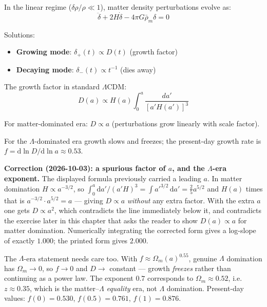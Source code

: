 \begin{theorem}\label{thm:linear-growth}
In the linear regime ($\delta \rho / \rho \ll 1$), matter density perturbations evolve as\cite{peebles1980,dodelson2003}:
\begin{equation}
\ddot{\delta} + 2H \dot{\delta} - 4\pi G \bar{\rho}_m \delta = 0
\end{equation}

Solutions:
\begin{itemize}
\item \textbf{Growing mode}: $\delta_+(t) \propto D(t)$ (growth factor)
\item \textbf{Decaying mode}: $\delta_-(t) \propto t^{-1}$ (dies away)
\end{itemize}

The growth factor in standard $\Lambda$CDM:
\begin{equation}
D(a) \propto H(a) \int_0^a \frac{da'}{[a' H(a')]^3}
\end{equation}

For matter-dominated era: $D \propto a$ (perturbations grow linearly with scale factor).

For the $\Lambda$-dominated era growth slows and freezes; the present-day growth
rate is $f = \mathrm{d}\ln D/\mathrm{d}\ln a \approx 0.53$.

\medskip
\noindent\textbf{Correction (2026-10-03): a spurious factor of $a$, and the
$\Lambda$-era exponent.}
The displayed formula previously carried a leading $a$. In matter domination
$H \propto a^{-3/2}$, so
$\int_0^a \mathrm{d}a'/(a'H)^3 = \int a'^{3/2}\,\mathrm{d}a' = \tfrac25 a^{5/2}$
and $H(a)$ times that is $a^{-3/2}\cdot a^{5/2} = a$ --- giving $D \propto a$
\emph{without} any extra factor. With the extra $a$ one gets $D \propto a^2$,
which contradicts the line immediately below it, and contradicts the exercise
later in this chapter that asks the reader to show $D(a) \propto a$ for matter
domination. Numerically integrating the corrected form gives a log-slope of
exactly $1.000$; the printed form gives $2.000$.

The $\Lambda$-era statement needs care too. With
$f \approx \Omega_m(a)^{0.55}$, genuine $\Lambda$ domination has
$\Omega_m \to 0$, so $f \to 0$ and $D \to$ constant --- growth \emph{freezes}
rather than continuing as a power law. The exponent $0.7$ corresponds to
$\Omega_m \approx 0.52$, i.e.\ $z \approx 0.35$, which is the matter--$\Lambda$
\emph{equality} era, not $\Lambda$ domination. Present-day values:
$f(0) = 0.530$, $f(0.5) = 0.761$, $f(1) = 0.876$.
\end{theorem}

